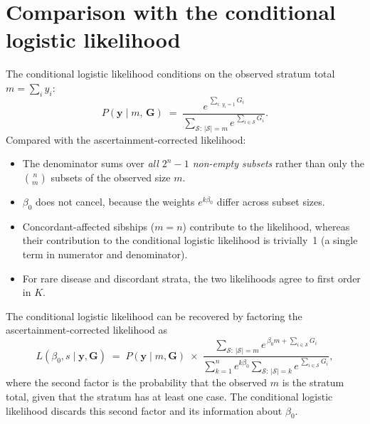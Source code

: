 \documentclass[12pt]{article}
\begin{document}
\section*{Comparison with the conditional logistic likelihood}

The conditional logistic likelihood conditions on the observed stratum total
$m = \sum_i y_i$:
\[
  P(\bm{y} \mid m,\, \bm{G})
  \;=\;
  \frac{e^{\,\sum_{i:\,y_i=1} G_i}}
       {\displaystyle\sum_{\mathcal{S}:\,|\mathcal{S}|=m}
        e^{\,\sum_{i\in\mathcal{S}} G_i}}.
\]
Compared with the ascertainment-corrected likelihood:
\begin{itemize}
  \item The denominator sums over \emph{all $2^n-1$ non-empty subsets}
        rather than only the $\binom{n}{m}$ subsets of the observed size $m$.
  \item $\beta_0$ does not cancel, because the weights $e^{k\beta_0}$ differ
        across subset sizes.
  \item Concordant-affected sibships ($m=n$) contribute to the likelihood,
        whereas their contribution to the conditional logistic likelihood is
        trivially~1 (a single term in numerator and denominator).
  \item For rare disease and discordant strata, the two likelihoods agree to
        first order in $K$.
\end{itemize}
The conditional logistic likelihood can be recovered by factoring the
ascertainment-corrected likelihood as
\[
  L(\beta_0, s \mid \bm{y}, \bm{G})
  \;=\;
  P(\bm{y} \mid m, \bm{G})
  \;\times\;
  \frac{\displaystyle\sum_{\mathcal{S}:\,|\mathcal{S}|=m}
        e^{\,\beta_0 m + \sum_{i\in\mathcal{S}} G_i}}
       {\displaystyle\sum_{k=1}^n e^{k\beta_0}
        \sum_{\mathcal{S}:\,|\mathcal{S}|=k}
        e^{\,\sum_{i\in\mathcal{S}} G_i}},
\]
where the second factor is the probability that the observed $m$ is the
stratum total, given that the stratum has at least one case.  The conditional
logistic likelihood discards this second factor and its information about
$\beta_0$.
\end{document}
